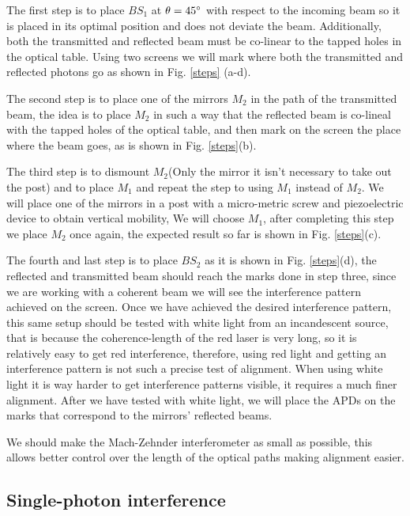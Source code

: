 \documentclass[12pt]{book}
\begin{document}
The first step is to place $BS_{1}$ at $\theta=45\degree$ with respect to the incoming beam so it is placed in its optimal position and does not deviate the beam. Additionally, both the transmitted and reflected beam must be co-linear to the tapped holes in the optical table. Using two screens we will mark where both the transmitted and reflected photons go as shown in Fig. \ref{steps} (a-d).

The second step is to place one of the mirrors $M_{2}$ in the path of the transmitted beam, the idea is to place $M_{2}$ in such a way that the reflected beam is co-lineal with the tapped holes of the optical table, and then mark on the screen the place where the beam goes, as is shown in Fig. \ref{steps}(b).

The third step is to dismount $M_{2}$(Only the mirror it isn't necessary to take out the post) and to place $M_{1}$ and repeat the step to using $M_{1}$ instead of $M_{2}$. We will place one of the mirrors in a post with a micro-metric screw and piezoelectric device to obtain vertical mobility, We will choose $M_{1}$, after completing this step we place $M_{2}$ once again, the expected result so far is shown in Fig. \ref{steps}(c).

The fourth and last step is to place $BS_{2}$ as it is shown in Fig. \ref{steps}(d), the reflected and transmitted beam should reach the marks done in step three, since we are working with a coherent beam we will see the interference pattern achieved on the screen. Once we have achieved the desired interference pattern, this same setup should be tested with white light from an incandescent source, that is because the coherence-length of the red laser is very long, so it is relatively easy to get red interference, therefore, using red light and getting an interference pattern is not such a precise test of alignment. When using white light it is way harder to get interference patterns visible, it requires a much finer alignment. After we have tested with white light, we will place the APDs on the marks that correspond to the mirrors' reflected beams.


We should make the Mach-Zehnder interferometer as small as possible, this allows better control over the length of the optical paths making alignment easier.

\subsection{Single-photon interference}
\end{document}

